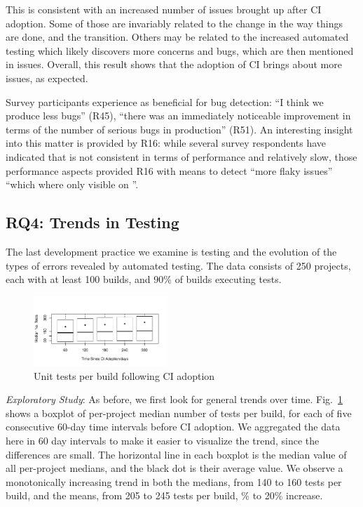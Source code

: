 This is consistent with an increased number of issues brought up after CI adoption. Some of those are invariably related to the change in the way things are done, and the transition. Others may be related to the increased automated testing which likely discovers more concerns and bugs, which are then mentioned in issues.
Overall, this result shows that the adoption of CI brings about more issues, as expected.

Survey participants experience \Tvi as beneficial for bug detection: ``I think we produce less bugs'' (R45), ``there was an immediately noticeable improvement in terms of the number of serious bugs in production'' (R51). 
An interesting insight into this matter is provided by R16: while several survey respondents have indicated that \Tvis is not consistent in terms of performance and relatively slow, those performance aspects provided R16 with means to detect ``more flaky issues'' ``which where only visible on \Tvi''. 

\subsection{RQ4: Trends in Testing}

The last development practice we examine is testing and the evolution 
of the types of errors revealed by automated testing.
The data consists of 250 projects, each with at least 100 builds, and 90\% 
of builds executing tests.

\begin{figure}[!t]
\centering
\includegraphics[width=0.45\textwidth, clip=true, trim=0 15 15 50]{tests.pdf}
\caption{Unit tests per build following CI adoption}
\label{Fig:Tests}
\end{figure}

\smallskip\noindent \emph{Exploratory Study}: 
As before, we first look for general trends over time.
Fig.~\ref{Fig:Tests} shows a boxplot of per-project median number of tests 
per build, for each of five consecutive 60-day time intervals before CI adoption.
We aggregated the data here in 60 day intervals to make it easier to visualize 
the trend, since the differences are small.
The horizontal line in each boxplot is the median value of all per-project medians, 
and the black dot is their average value.
We observe a monotonically increasing trend in both the medians, from 140 to 
160 tests per build, and the means, from 205 to 245 tests per build, \% to 
20\% increase. 

